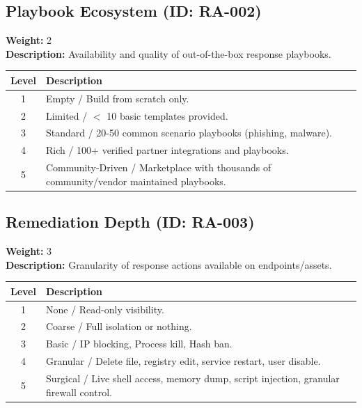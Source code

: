 \documentclass{article}
\begin{document}
\subsection{Playbook Ecosystem (ID: RA-002)}
\textbf{Weight:} 2 \\
\textbf{Description:} Availability and quality of out-of-the-box response playbooks.
\vspace{0.3cm}
\begin{longtable}{|c|p{12cm}|}
\hline
\rowcolor{lightgray} \textbf{Level} & \textbf{Description} \\ \hline
1 & Empty / Build from scratch only. \\ \hline
2 & Limited / $<$ 10 basic templates provided. \\ \hline
3 & Standard / 20-50 common scenario playbooks (phishing, malware). \\ \hline
4 & Rich / 100+ verified partner integrations and playbooks. \\ \hline
5 & Community-Driven / Marketplace with thousands of community/vendor maintained playbooks. \\ \hline
\end{longtable}
\vspace{0.5cm}
\subsection{Remediation Depth (ID: RA-003)}
\textbf{Weight:} 3 \\
\textbf{Description:} Granularity of response actions available on endpoints/assets.
\vspace{0.3cm}
\begin{longtable}{|c|p{12cm}|}
\hline
\rowcolor{lightgray} \textbf{Level} & \textbf{Description} \\ \hline
1 & None / Read-only visibility. \\ \hline
2 & Coarse / Full isolation or nothing. \\ \hline
3 & Basic / IP blocking, Process kill, Hash ban. \\ \hline
4 & Granular / Delete file, registry edit, service restart, user disable. \\ \hline
5 & Surgical / Live shell access, memory dump, script injection, granular firewall control. \\ \hline
\end{longtable}
\vspace{0.5cm}
\end{document}
